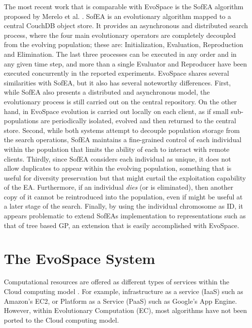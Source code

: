 The most recent work that is comparable with EvoSpace is the SofEA algorithm proposed by Merelo et al. \cite{sofea1,sofea2}.
SofEA is an evolutionary algorithm mapped to a central CouchDB object store. It provides an asynchronous and distributed search process,
where the four main evolutionary operators are completely decoupled from the evolving population; these are: Initialization, Evaluation, Reproduction and Elimination.
The last three processes can be executed in any order and in any given time step, and more than a single Evaluator and Reproducer have been executed concurrently
in the reported experiments.
EvoSpace shares several similarities with SofEA, but it also has several noteworthy differences.
First, while SofEA also presents a distributed and asynchronous model, the evolutionary process is still carried out on the central repository.
On the other hand, in EvoSpace evolution is carried out locally on each client, as if small sub-populations are periodically isolated, evolved and then returned to the central store.
Second, while both systems attempt to decouple population storage from the search operations, SofEA maintains a fine-grained control of each individual
within the population that limits the ability of each to interact with remote clients.
Thirdly, since SofEA considers each individual as unique, it does not allow duplicates to appear within the evolving population, something that is useful for diversity preservation but that might curtail the exploitation capability of the EA.
Furthermore, if an individual \emph{dies} (or is eliminated), then another copy of it cannot be reintroduced into the population, even if might be useful
at a later stage of the search.
Finally, by using the individual chromosome as ID, it appears problematic to extend SofEAs implementation to representations such as that of
tree based GP, an extension that is easily accomplished with EvoSpace.

\section{The EvoSpace System} %
\label{sec:evospace}
Computational resources are offered as different types of services within the Cloud computing model \cite{cloud}.
For example, infrastructure as a service (IaaS) such as Amazon's EC2, or Platform as a Service (PaaS) such as Google's App Engine.
However, within Evolutionary Computation (EC), most algorithms have
not been ported to the Cloud computing model. %


